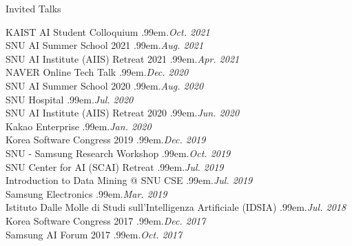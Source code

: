 \documentclass{resume} %
\makeatletter
\newcommand \Dotfill {\leavevmode \cleaders \hb@xt@ .99em{\hss .\hss }\hfill \kern \z@}
\makeatother
\begin{document}
\begin{rSection}{Invited Talks}

KAIST AI Student Colloquium \smallskip \Dotfill \emph{Oct. 2021} \\ 
SNU AI Summer School 2021 \smallskip \Dotfill \emph{Aug. 2021} \\ 
SNU AI Institute (AIIS) Retreat 2021 \smallskip \Dotfill \emph{Apr. 2021} \\ 
NAVER Online Tech Talk \smallskip \Dotfill \emph{Dec. 2020} \\ 
SNU AI Summer School 2020 \smallskip \Dotfill \emph{Aug. 2020} \\ 
SNU Hospital \smallskip \Dotfill \emph{Jul. 2020} \\ 
SNU AI Institute (AIIS) Retreat 2020 \smallskip \Dotfill \emph{Jun. 2020}\\ 
Kakao Enterprise \smallskip \Dotfill \emph{Jan. 2020} \\ 
Korea Software Congress 2019 \smallskip \Dotfill \emph{Dec. 2019} \\ 
SNU - Samsung Research Workshop \smallskip \Dotfill \emph{Oct. 2019} \\ 
SNU Center for AI (SCAI) Retreat \smallskip \Dotfill \emph{Jul. 2019} \\ 
Introduction to Data Mining @ SNU CSE \smallskip \Dotfill \emph{Jul. 2019} \\ 
Samsung Electronics \smallskip \Dotfill \emph{Mar. 2019} \\ 
Istituto Dalle Molle di Studi sull'Intelligenza Artificiale (IDSIA) \smallskip \Dotfill \emph{Jul. 2018} \\ 
Korea Software Congress 2017 \smallskip \Dotfill \emph{Dec. 2017} \\ 
Samsung AI Forum 2017 \smallskip \Dotfill \emph{Oct. 2017}

\end{rSection}

\end{document}
